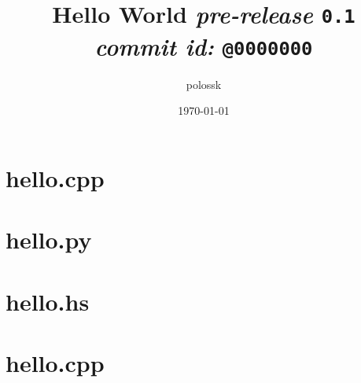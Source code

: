 \documentclass{article}
\title{\textbf{Hello World}
\textit{pre-release}
\texttt{0.1} \\
\textit{commit id:}
\texttt{@0000000}}
\author{polossk}
\date{\today}
\begin{document}
\maketitle
\small\tableofcontents
\thispagestyle{fancy}
\renewcommand{\baselinestretch}{1.25}
\fSong\normalsize

\section{hello.cpp}

\section{hello.py}

\section{hello.hs}

\section{hello.cpp}

\end{document}
